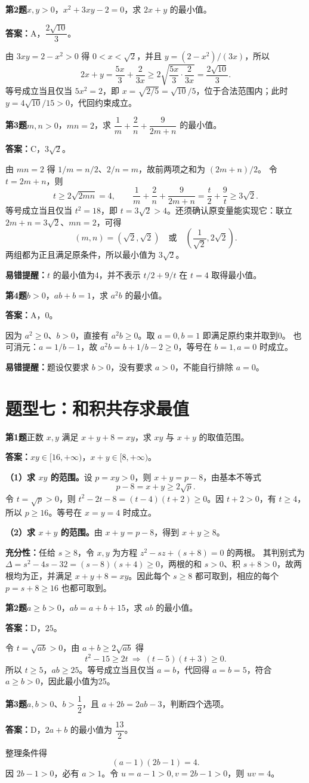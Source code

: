 \documentclass[UTF8,a4paper,11pt]{ctexart}
\newcommand{\topic}[2]{\clearpage\section*{#1}\vspace{-4pt}{\small\color{gray}原卷位置：第#2页。题号与原卷一致。}\par\medskip}
\newcommand{\q}[3]{\par\Needspace{7\baselineskip}\textbf{\color{accent}第#1题}\quad #2\par\textbf{答案：}#3\par}
\newcommand{\tip}[1]{\par{\small\textbf{易错提醒：}#1}\par}
\begin{document}
\q{2}{$x,y>0$，$x^2+3xy-2=0$，求 $2x+y$ 的最小值。}{A，$\dfrac{2\sqrt{10}}3$。}
由 $3xy=2-x^2>0$ 得 $0<x<\sqrt2$，并且 $y=(2-x^2)/(3x)$，所以
\[
2x+y=\frac{5x}{3}+\frac2{3x}\ge2\sqrt{\frac{5x}{3}\cdot\frac2{3x}}=\frac{2\sqrt{10}}3.
\]
等号成立当且仅当 $5x^2=2$，即 $x=\sqrt{2/5}=\sqrt{10}/5$，位于合法范围内；此时 $y=4\sqrt{10}/15>0$，代回约束成立。

\q{3}{$m,n>0$，$mn=2$，求 $\dfrac1m+\dfrac2n+\dfrac9{2m+n}$ 的最小值。}{C，$3\sqrt2$。}
由 $mn=2$ 得 $1/m=n/2$、$2/n=m$，故前两项之和为 $(2m+n)/2$。
令 $t=2m+n$，则
\[
t\ge2\sqrt{2mn}=4,\qquad
\frac1m+\frac2n+\frac9{2m+n}=\frac t2+\frac9t\ge3\sqrt2.
\]
等号成立当且仅当 $t^2=18$，即 $t=3\sqrt2>4$。还须确认原变量能实现它：联立 $2m+n=3\sqrt2$、$mn=2$，可得
\[
(m,n)=(\sqrt2,\sqrt2)\quad\text{或}\quad
\left(\frac1{\sqrt2},2\sqrt2\right).
\]
两组都为正且满足原条件，所以最小值为 $3\sqrt2$。
\tip{$t$ 的最小值为4，并不表示 $t/2+9/t$ 在 $t=4$ 取得最小值。}

\q{4}{$b>0$，$ab+b=1$，求 $a^2b$ 的最小值。}{A，$0$。}
因为 $a^2\ge0$、$b>0$，直接有 $a^2b\ge0$。取 $a=0,b=1$ 即满足原约束并取到0。
也可消元：$a=1/b-1$，故 $a^2b=b+1/b-2\ge0$，等号在 $b=1,a=0$ 时成立。
\tip{题设仅要求 $b>0$，没有要求 $a>0$，不能自行排除 $a=0$。}

\topic{题型七：和积共存求最值}{4}
\q{1}{正数 $x,y$ 满足 $x+y+8=xy$，求 $xy$ 与 $x+y$ 的取值范围。}{$xy\in[16,+\infty)$，$x+y\in[8,+\infty)$。}
\textbf{（1）求 $xy$ 的范围。}设 $p=xy>0$，则 $x+y=p-8$，由基本不等式
\[
p-8=x+y\ge2\sqrt p.
\]
令 $t=\sqrt p>0$，则 $t^2-2t-8=(t-4)(t+2)\ge0$。因 $t+2>0$，有 $t\ge4$，所以 $p\ge16$。等号在 $x=y=4$ 时成立。

\textbf{（2）求 $x+y$ 的范围。}由 $x+y=p-8$，得到 $x+y\ge8$。

\textbf{充分性：}任给 $s\ge8$，令 $x,y$ 为方程 $z^2-sz+(s+8)=0$ 的两根。
其判别式为 $\Delta=s^2-4s-32=(s-8)(s+4)\ge0$，两根的和 $s>0$、积 $s+8>0$，故两根均为正，并满足 $x+y+8=xy$。因此每个 $s\ge8$ 都可取到，相应的每个 $p=s+8\ge16$ 也都可取到。

\q{2}{$a\ge b>0$，$ab=a+b+15$，求 $ab$ 的最小值。}{D，$25$。}
令 $t=\sqrt{ab}>0$，由 $a+b\ge2\sqrt{ab}$ 得
\[
t^2-15\ge2t\ \Longrightarrow\ (t-5)(t+3)\ge0.
\]
所以 $t\ge5$，$ab\ge25$。等号成立当且仅当 $a=b$，代回得 $a=b=5$，符合 $a\ge b>0$，因此最小值为25。

\q{3}{$a,b>0$、$b>\dfrac12$，且 $a+2b=2ab-3$，判断四个选项。}{D，$2a+b$ 的最小值为 $\dfrac{13}2$。}
整理条件得
\[
(a-1)(2b-1)=4.
\]
因 $2b-1>0$，必有 $a>1$。令 $u=a-1>0,v=2b-1>0$，则 $uv=4$。
\end{document}
